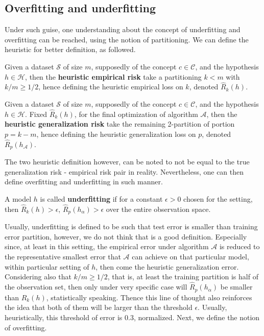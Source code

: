\documentclass[10pt,oneside,oldfontcommands,dvipsnames,article]{memoir}
\begin{document}
\subsection{Overfitting and underfitting}
Under such guise, one understanding about the concept of underfitting and overfitting \cite{gareth_james_introduction_2013} can be reached, using the notion of partitioning. We can define the heuristic for better definition, as followed. 

\begin{definition}
  Given a dataset $\mathcal{S}$ of size $m$, supposedly of the concept $c\in \mathcal{C}$, and the hypothesis $h\in \mathcal{H}$, then the \textbf{heuristic empirical risk} take a partitioning $k<m$ with $k/m\geq 1/2$, hence defining the heuristic empirical loss on $k$, denoted $\hat{R}_{k}(h)$. 
\end{definition}

\begin{definition}
  Given a dataset $\mathcal{S}$ of size $m$, supposedly of the concept $c\in \mathcal{C}$, and the hypothesis $h\in \mathcal{H}$. Fixed $\hat{R}_{k}(h)$, for the final optimization of algorithm $\mathcal{A}$, then the \textbf{heuristic generalization risk} take the remaining 2-partition of portion $p=k-m$, hence defining the heuristic generalization loss on $p$, denoted $\hat{R}_{p}(h_{\mathcal{A}})$. 
\end{definition}
The two heuristic definition however, can be noted to not be equal to the true generalization risk - empirical risk pair in reality. Nevertheless, one can then define overfitting and underfitting in such manner. 
\begin{definition}[Underfitting]
  A model $h$ is called \textbf{underfitting} if for a constant $\epsilon > 0$ chosen for the setting, then $\hat{R}_{k}(h)>\epsilon$, $\hat{R}_{p}(h_{\alpha})> \epsilon$ over the entire observation space. 
\end{definition}
Usually, underfitting is defined to be such that test error is smaller than training error partition, however, we do not think that is a good definition. Especially since, at least in this setting, the empirical error under algorithm $\mathcal{A}$ is reduced to the representative smallest error that $\mathcal{A}$ can achieve on that particular model, within particular setting of $h$, then come the heuristic generalization error. Considering also that $k/m\geq 1/2$, that is, at least the training partition is half of the observation set, then only under very specific case will $\hat{R}_{p}(h_{\alpha})$ be smaller than $\hat{R}_{k}(h)$, statistically speaking. Thence this line of thought also reinforces the idea that both of them will be larger than the threshold $\epsilon$. Usually, heuristically, this threshold of error is $0.3$, normalized. Next, we define the notion of overfitting. 
\end{document}
